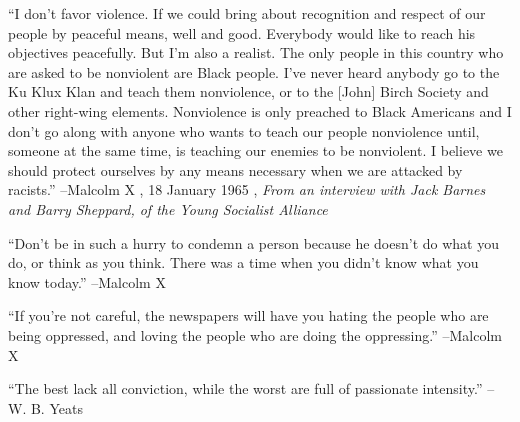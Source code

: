 \documentclass{article}%
\begin{document}
\begin{minipage}{\textwidth}%
\flushleft%
“I don't favor violence. If we could bring about recognition and respect of our people by peaceful means, well and good. Everybody would like to reach his objectives peacefully. But I'm also a realist. The only people in this country who are asked to be nonviolent are Black people. I've never heard anybody go to the Ku Klux Klan and teach them nonviolence, or to the {[}John{]} Birch Society and other right{-}wing elements. Nonviolence is only preached to Black Americans and I don't go along with anyone who wants to teach our people nonviolence until, someone at the same time, is teaching our enemies to be nonviolent. I believe we should protect ourselves by any means necessary when we are attacked by racists.”%
\linebreak%
\vspace{1mm}%
–Malcolm X%
, 18 January 1965%
, \textit{From an interview with Jack Barnes and Barry Sheppard, of the Young Socialist Alliance}%
\linebreak%
\vspace{1mm}%
\end{minipage}%
\linebreak%
\vspace{1mm}%
\begin{minipage}{\textwidth}%
\flushleft%
“Don't be in such a hurry to condemn a person because he doesn't do what you do, or think as you think. There was a time when you didn't know what you know today.”%
\linebreak%
\vspace{1mm}%
–Malcolm X%
\linebreak%
\vspace{1mm}%
\end{minipage}%
\linebreak%
\vspace{1mm}%
\begin{minipage}{\textwidth}%
\flushleft%
“If you're not careful, the newspapers will have you hating the people who are being oppressed, and loving the people who are doing the oppressing.”%
\linebreak%
\vspace{1mm}%
–Malcolm X%
\linebreak%
\vspace{1mm}%
\end{minipage}%
\linebreak%
\vspace{1mm}%
\begin{minipage}{\textwidth}%
\flushleft%
“The best lack all conviction, while the worst are full of passionate intensity.”%
\linebreak%
\vspace{1mm}%
–W. B. Yeats%
\linebreak%
\vspace{1mm}%
\end{minipage}%
\end{document}
